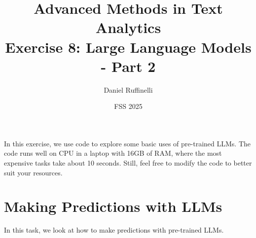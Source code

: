 \documentclass[11pt,a4paper]{article}
\title{Advanced Methods in Text Analytics \\ 
Exercise 8: Large Language Models - Part 2}
\author{Daniel Ruffinelli}
\date{FSS 2025}
\begin{document}
\maketitle

In this exercise, we use code to explore some basic uses of pre-trained LLMs.
The code runs well on CPU in a laptop with 16GB of RAM, where the most expensive
tasks take about 10 seconds. Still, feel free to modify the code to better suit
your resources.



\section{Making Predictions with LLMs}

In this task, we look at how to make predictions with pre-trained LLMs.
\end{document}
